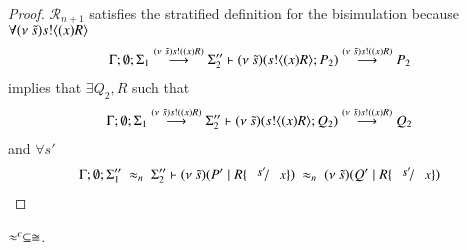 \begin{proof}
	\noi $\mathcal{R}_{n+1}$ satisfies the stratified definition for the bisimulation 
	because $\forall (\nu\ \tilde{s}) s ! \langle (x) R \rangle $
%
	\begin{eqnarray*}
		\Gamma; \emptyset; \Sigma_1 \stackrel{(\nu\ \tilde{s}) s! ((x) R)}{\longrightarrow} \Sigma_2'' \vdash (\nu\ \tilde{s})(s ! \langle (x)R \rangle ; P_2) \stackrel{(\nu\ \tilde{s}) s! ((x) R)}{\longrightarrow} P_2
	\end{eqnarray*}
%
	implies that $\exists Q_2, R$ such that
%
	\begin{eqnarray*}
		\Gamma; \emptyset; \Sigma_1 \stackrel{(\nu\ \tilde{s}) s! ((x) R)}{\longrightarrow} \Sigma_2'' \vdash (\nu\ \tilde{s})(s ! \langle (x)R \rangle ; Q_2) \stackrel{(\nu\ \tilde{s}) s! ((x) R)}{\longrightarrow} Q_2
	\end{eqnarray*}
%
	\noi and $\forall s'$
%
	\begin{eqnarray*}
		\Gamma; \emptyset; \Sigma_1'' \ \wb_{n}\ \Sigma_2'' \proves \newsp{\tilde{s}}{P' \Par R \subst{s'}{x}}\ \wb_{n}\ 
		\newsp{\tilde{s}}{Q' \Par R \subst{s'}{x}}
	\end{eqnarray*}
%
\begin{comment}
	\noi We apply the induction hypothesis to get that
	$\forall C, s'$
%
	\begin{eqnarray}
		\Gamma; \emptyset; \Sigma_1'' \ \wbc_{n}\ \Sigma_2'' \proves \newsp{\tilde{s}}{\context{C}{P' \Par P \subst{s'}{x}}}\ \wbc_{n}\ 
		\newsp{\tilde{s}}{\context{C}{Q' \Par Q \subst{s'}{x}}} \label{lem:wb_is_wbc3}
	\end{eqnarray}
	\noi Assume $\mathcal{R}_{n+1} = \set{\Gamma; \emptyset; \Sigma_1 \proves P_1 \hastype \Proc, \Gamma; \emptyset; \Sigma_2 \proves Q_1 \hastype \Proc}$.

	\noi $\mathcal{R}_{n+1}$ satisfies the condition for the stratified definition for bisimulation
	because statement~\ref{lem:wbc_is_wb7} implies that
	$\exists Q', s_2$ such that
	statement~\ref{lem:wbc_is_wb8} holds and furthemore statement~\ref{lem:wbc_is_wb9} holds.
\end{comment}
\end{proof}



\begin{lemma}
	\label{lem:wbc_is_cong}
	$\approx^{c} \subseteq \cong$.
\end{lemma}


